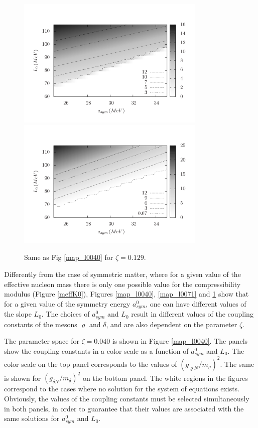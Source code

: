 \documentclass[twocolumn,showpacs,aps]{revtex4}
\begin{document}
\begin{figure}[ht]
\centering
  \includegraphics[width=9cm]{map_l0129_gr.png}
    \centering
  \includegraphics[width=9cm]{map_l0129_gd.png}
    \caption{Same as Fig \ref{map_l0040} for $\zeta=0.129$. }\label{map_l0129}
\end{figure} 

Differently from the case of symmetric matter, where for a given value of the effective nucleon mass there is only one possible value for the compressibility modulus
(Figure \ref{meffK0}), Figures \ref{map_l0040}, \ref{map_l0071} and \ref{map_l0129} show that for a given value of the symmetry energy $a_{sym}^0$,
one can have different values of the slope $L_0$. The choices of $a_{sym}^0$ and $L_0$ result in different values of the coupling constants of the mesons
$\varrho$ and $\delta$, and are also dependent on the parameter $\zeta$.

The parameter space for $\zeta=0.040$ is shown in Figure \ref{map_l0040}. The panels show the coupling constants in a color scale as a 
function of $a_{sym}^0$ and $L_0$. The color scale on the top panel corresponds to the values 
of $(g_{\varrho N}/m_{\varrho})^2$. The same is shown for $(g_{\delta N}/m_{\delta})^2$ on the bottom panel.
The white regions in the figures correspond to the cases where no solution for the system of equations exists.
Obviously, the values of the coupling constants must be selected simultaneously in both panels, in order to guarantee that their
values are associated with the same solutions for $a_{sym}^0$ and $L_0$.
\end{document}
